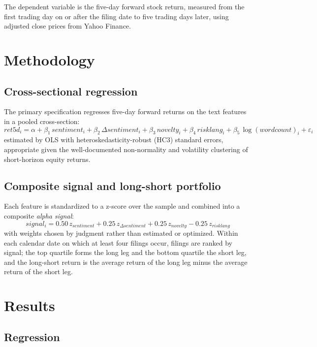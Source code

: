\documentclass[11pt]{article}
\begin{document}
The dependent variable is the five-day forward stock return, measured from the first trading day on or after the filing date to five trading days later, using adjusted close prices from Yahoo Finance.

\section{Methodology}

\subsection{Cross-sectional regression}

The primary specification regresses five-day forward returns on the text features in a pooled cross-section:
\begin{equation}
ret5d_{i} = \alpha + \beta_1 \, sentiment_{i} + \beta_2 \, \Delta sentiment_{i} + \beta_3 \, novelty_{i} + \beta_4 \, risklang_{i} + \beta_5 \, \log(wordcount)_{i} + \varepsilon_i
\end{equation}
estimated by OLS with heteroskedasticity-robust (HC3) standard errors, appropriate given the well-documented non-normality and volatility clustering of short-horizon equity returns.

\subsection{Composite signal and long-short portfolio}

Each feature is standardized to a z-score over the sample and combined into a composite \textit{alpha signal}:
\begin{equation}
signal_i = 0.50\, z_{sentiment} + 0.25\, z_{\Delta sentiment} + 0.25\, z_{novelty} - 0.25\, z_{risklang}
\end{equation}
with weights chosen by judgment rather than estimated or optimized. Within each calendar date on which at least four filings occur, filings are ranked by signal; the top quartile forms the long leg and the bottom quartile the short leg, and the long-short return is the average return of the long leg minus the average return of the short leg.

\section{Results}

\subsection{Regression}
\end{document}
